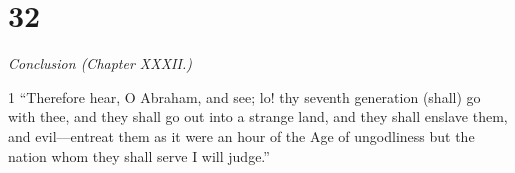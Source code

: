 \chapter{32}

\par \textit{Conclusion (Chapter XXXII.)}

\par 1 “Therefore hear, O Abraham, and see; lo! thy seventh generation (shall) go with thee, and they shall go out into a strange land, and they shall enslave them, and evil—entreat them as it were an hour of the Age of ungodliness but the nation whom they shall serve I will judge.”


